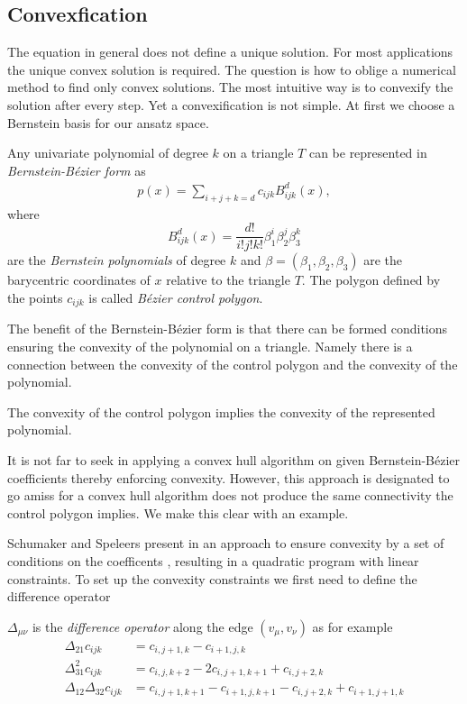 \subsection{Convexfication}
The \MA equation in general does not define a unique solution. For most applications the unique convex solution is required. The question is how to oblige a numerical method to find only convex solutions.
The most intuitive way is to convexify the solution after every step. Yet a convexification is not simple. At first we choose a Bernstein basis for our ansatz space.
\begin{definition}
	Any univariate polynomial of degree $k$ on a triangle $T$ can be represented in \emph{Bernstein-B\'ezier form} as
\begin{align}
	p(x) = \sum_{i+j+k = d}  c_{ijk} B^d_{ijk}(x),
\end{align}
where
\[
	B^d_{ijk}(x) = \frac {d!}{i!j!k!} \beta_1^i \beta_2^j \beta_3^k
\]
are the \emph{Bernstein polynomials} of degree $k$ and $\beta = (\beta_1, \beta_2, \beta_3)$ are the barycentric coordinates of $x$ relative to the triangle $T$.
The polygon defined by the points $c_{ijk}$ is called \emph{B\'ezier control polygon}.
\end{definition}

The benefit of the Bernstein-B\'ezier form is that there can be formed conditions ensuring the convexity of the polynomial on a triangle. Namely there is a connection between the convexity of the control polygon and the convexity of the polynomial.
\begin{theorem}
	The convexity of the control polygon implies the convexity of the represented polynomial.
\end{theorem}
It is not far to seek in applying a convex hull algorithm on given Bernstein-B\'ezier coefficients thereby enforcing convexity. However, this approach is designated to go amiss for a convex hull algorithm does not produce the same connectivity the control polygon implies. We make this clear with an example.


Schumaker and Speleers present in \cite{SS2014} an approach to ensure convexity by a set of conditions on the coefficents , resulting in a quadratic program with linear constraints. To set up the convexity constraints we first need to define the difference operator
\begin{definition}
	$\Delta_{\mu \nu}$ is the \emph{difference operator} along the edge $(v_\mu, v_\nu)$ as for example
	\begin{align*}
		\Delta_{21} c_{ijk} &= c_{i,j+1,k} -c_{i+1, j,k}  \\
		\Delta_{31}^2 c_{ijk} &= c_{i,j,k+2} -2c_{i, j+1,k+1} +c_{i, j+2,k} \\
		\Delta_{12} \Delta_{32} c_{ijk} &= c_{i,j+1,k+1} -c_{i+1, j,k+1} - c_{i,j+2,k} +c_{i+1, j+1,k}\\	\end{align*}
\end{definition}
 
